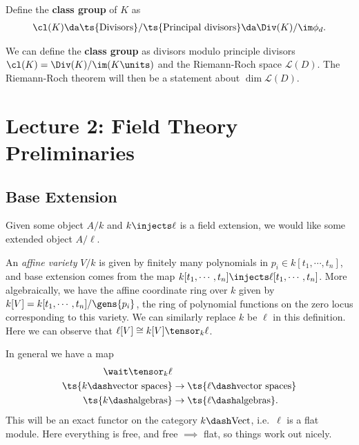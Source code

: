 \begin{definition}

Define the \textbf{class group} of \(K\) as
\begin{align*}  
\cl(K) \da \ts{\text{Divisors}} / \ts{\text{Principal divisors}} \da \Div(K) / \im \phi_d
.\end{align*}

\end{definition}

We can define the \textbf{class group} as divisors modulo principle
divisors \(\cl(K) = \Div(K) / \im(K\units)\) and the Riemann-Roch space
\(\mathcal{L}(D)\). The Riemann-Roch theorem will then be a statement
about \(\dim \mathcal{L}(D)\).

\hypertarget{lecture-2-field-theory-preliminaries}{%
\section{Lecture 2: Field Theory
Preliminaries}\label{lecture-2-field-theory-preliminaries}}

\hypertarget{base-extension}{%
\subsection{Base Extension}\label{base-extension}}

Given some object \(A/k\) and \(k\injects \ell\) is a field extension,
we would like some extended object \(A/\ell\).

\begin{example}

An \emph{affine variety} \(V/k\) is given by finitely many polynomials
in \(p_i \in k[t_1, \cdots, t_n]\), and base extension comes from the
map \(k[t_1, \cdots, t_n] \injects \ell[t_1, \cdots, t_n]\). More
algebraically, we have the affine coordinate ring over \(k\) given by
\(k[V] = k[t_1,\cdots, t_n]/\gens{p_i}\), the ring of polynomial
functions on the zero locus corresponding to this variety. We can
similarly replace \(k\) be \(\ell\) in this definition. Here we can
observe that \(\ell[V] \cong k[V] \tensor_k \ell\).

\end{example}

In general we have a map
\begin{align*}  
\wait \tensor_k \ell & \\
\ts{k\dash\text{vector spaces}} &\to \ts{\ell\dash\text{vector spaces}} \\
\ts{k\dash\text{algebras}} &\to\ts{\ell\dash\text{algebras}}
.\end{align*} This will be an exact functor on the category
\(k\dash\text{Vect}\), i.e.~\(\ell\) is a flat module. Here everything
is free, and free \(\implies\) flat, so things work out nicely.

